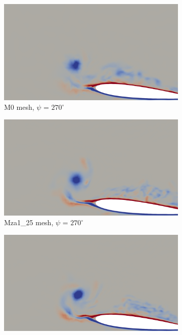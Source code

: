 \begin{figure}[H]
	\centering
	\begin{center}
		\begin{subfigure}[b]{0.475\textwidth}
		\centering
		\includegraphics[width=1\textwidth]{figures/zonal_adapt_results/vorticity_plots/v3/M0/spavg/phase_270.png}
		\caption{M0 mesh, $\psi$ = $270^\circ$}
		\label{fig:M0_sp_psi270}
		\end{subfigure}
	\end{center}
	\begin{subfigure}[b]{0.475\textwidth}
	\centering
	\includegraphics[width=1\textwidth]{figures/zonal_adapt_results/vorticity_plots/v3/Mza1_25/spavg/phase_270.png}
	\caption{Mza1\_25 mesh, $\psi$ = $270^\circ$}
	\label{fig:Mza1_25_sp_psi270}
	\end{subfigure}
	\begin{subfigure}[b]{0.475\textwidth}
		\centering
		\includegraphics[width=1\textwidth]{figures/zonal_adapt_results/vorticity_plots/v3/Mza1_50/spavg/phase_270.png}

\end{subfigure}
\end{figure}
